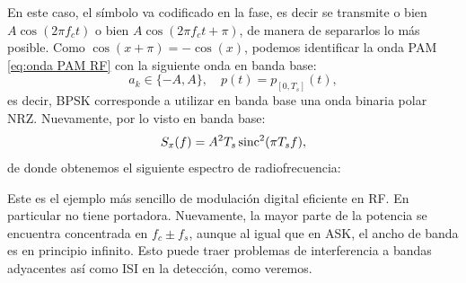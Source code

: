 \begin{ejemplo}
    En este caso, el símbolo va codificado en la fase, es decir se transmite o bien $A\cos(2\pi f_c t)$ o bien $A\cos(2\pi f_c t + \pi)$, de manera de separarlos lo más posible. Como $\cos(x+\pi) = -\cos(x)$, podemos identificar la onda PAM \eqref{eq:onda PAM RF} con la siguiente onda en banda base:
    \begin{equation*}
        a_k \in \{-A,A\}, \quad p(t) = p_{[0,T_s]}(t),
    \end{equation*}
    es decir, BPSK corresponde a utilizar en banda base una onda binaria polar NRZ. Nuevamente, por lo visto en banda base:
    \begin{equation*}
        S_x(f) = A^2 T_s \operatorname{sinc}^2(\pi T_s f),
    \end{equation*}
    de donde obtenemos el siguiente espectro de radiofrecuencia:
    \begin{center}
    \end{center}

    Este es el ejemplo más sencillo de modulación digital eficiente en RF. En particular no tiene portadora. Nuevamente, la mayor parte de la potencia se encuentra concentrada en $f_c \pm f_s$, aunque al igual que en ASK, el ancho de banda es en principio infinito. Esto puede traer problemas de interferencia a bandas adyacentes así como ISI en la detección, como veremos.
\end{ejemplo}

